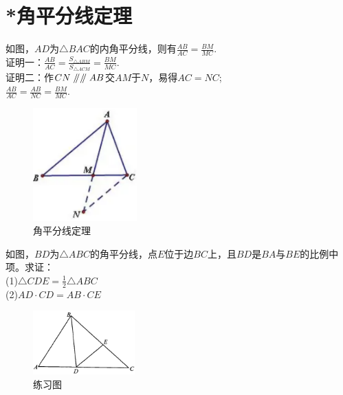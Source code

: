 \documentclass{ecnuthesis}
\newcommand\px{\mathrel{/\mkern-5mu/}}  %
\begin{document}
\section{*角平分线定理}
\begin{model}
    如图，$AD$为$\triangle BAC$的内角平分线，则有$\frac{AB}{AC}=\frac{BM}{MC}.$ \\
    证明一：$\frac{AB}{AC}=\frac{S_{\triangle ABM}}{S_{\triangle ACM}}=\frac{BM}{MC}$. \\
    证明二：作$CN\px \px AB$交$AM$于$N$，易得$AC=NC$; \\
    $\frac{AB}{AC}=\frac{AB}{NC}=\frac{BM}{MC}.$
\end{model}
\begin{figure}[H]
\centering
\includegraphics[width=4cm]{picture/854.png}
\caption{角平分线定理}
\end{figure}
\begin{problem}
    如图，$BD$为$\triangle ABC$的角平分线，点$E$位于边$BC$上，且$BD$是$BA$与$BE$的比例中项。求证：\\
    (1)$\triangle CDE=\frac{1}{2}\triangle ABC$ \\
    (2)$AD·CD=AB·CE$
\end{problem}
\begin{figure}[H]
\centering
\includegraphics[width=4cm]{picture/811.png}
\caption{练习图}
\end{figure}
\clearpage
\end{document}
